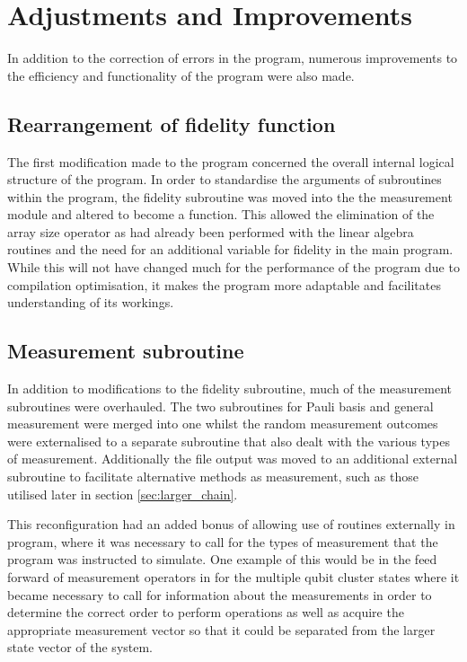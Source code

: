
\clearpage
\section{Adjustments and Improvements}

In addition to the correction of errors in the program, numerous improvements to the efficiency and functionality of the program were also made.


\subsection{Rearrangement of fidelity function}

The first modification made to the program concerned the overall internal logical structure of the program. In order to standardise the arguments of subroutines within the program, the fidelity subroutine was moved into the the measurement module and altered to become a function. This allowed the elimination of the array size operator as had already been performed with the linear algebra routines and the need for an additional variable for fidelity in the main program. While this will not have changed much for the performance of the program due to compilation optimisation, it makes the program more adaptable and facilitates understanding of its workings.



\subsection{Measurement subroutine}
\label{subsec:m_sub_improv}

In addition to modifications to the fidelity subroutine, much of the measurement subroutines were overhauled. The two subroutines for Pauli basis and general measurement were merged into one whilst the random measurement outcomes were externalised to a separate subroutine that also dealt with the various types of measurement. Additionally the file output was moved to an additional external subroutine to facilitate alternative methods as measurement, such as those utilised later in section \ref{sec:larger_chain}.


This reconfiguration had an added bonus of allowing use of routines externally in program, where it was necessary to call for the types of measurement that the program was instructed to simulate. One example of this would be in the feed forward of measurement operators in for the multiple qubit cluster states where it became necessary to call for information about the measurements in order to determine the correct order to perform operations as well as acquire the appropriate measurement vector so that it could be separated from the larger state vector of the system.

